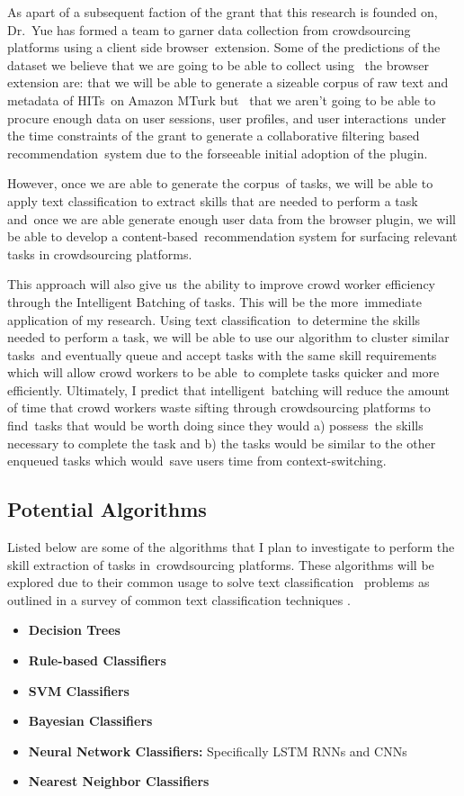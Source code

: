 \documentclass[letterpaper,12pt]{article}
\begin{document}
As apart of a subsequent faction of the grant that this research is founded on, Dr.\
Yue has formed a team to garner data collection from crowdsourcing platforms using a client side browser\
extension. Some of the predictions of the dataset we believe that we are going to be able to collect using \
the browser extension are: that we will be able to generate a sizeable corpus of raw text and metadata of HITs\
on Amazon MTurk but \
that we aren't going to be able to procure enough data on user sessions, user profiles, and user interactions\
under the time constraints of the grant to generate a collaborative filtering based recommendation\
system due to the forseeable initial adoption of the plugin. 

However, once we are able to generate the corpus\
of tasks, we will be able to apply text classification to extract skills that are needed to perform a task and\
once we are able generate enough user data from the browser plugin, we will be able to develop a content-based\
recommendation system for surfacing relevant tasks in crowdsourcing platforms. 

This approach will also give us\
the ability to improve crowd worker efficiency through the Intelligent Batching of tasks. This will be the more\
immediate application of my research. Using text classification\
to determine the skills needed to perform a task, we will be able to use our algorithm to cluster similar tasks\
and eventually queue and accept tasks with the same skill requirements which will allow crowd workers to be able\
to complete tasks quicker and more efficiently. Ultimately, I predict that intelligent\
batching will reduce the amount of time that crowd workers waste sifting through crowdsourcing platforms to find\
tasks that would be worth doing since they would a) possess\
the skills necessary to complete the task and b) the tasks would be similar to the other enqueued tasks which would\
save users time from context-switching.
\subsection{Potential Algorithms}
Listed below are some of the algorithms that I plan to investigate to perform the skill extraction of tasks in\
crowdsourcing platforms. These algorithms will be explored due to their common usage to solve text classification \
problems as outlined in a survey of common text classification techniques \cite{aggarwal2012survey}.
\begin{itemize}
	\item \textbf{Decision Trees}
	\item \textbf{Rule-based Classifiers}
	\item \textbf{SVM Classifiers}
	\item \textbf{Bayesian Classifiers}
	\item \textbf{Neural Network Classifiers:} Specifically LSTM RNNs and CNNs
	\item \textbf{Nearest Neighbor Classifiers}
\end{itemize}
\end{document}

